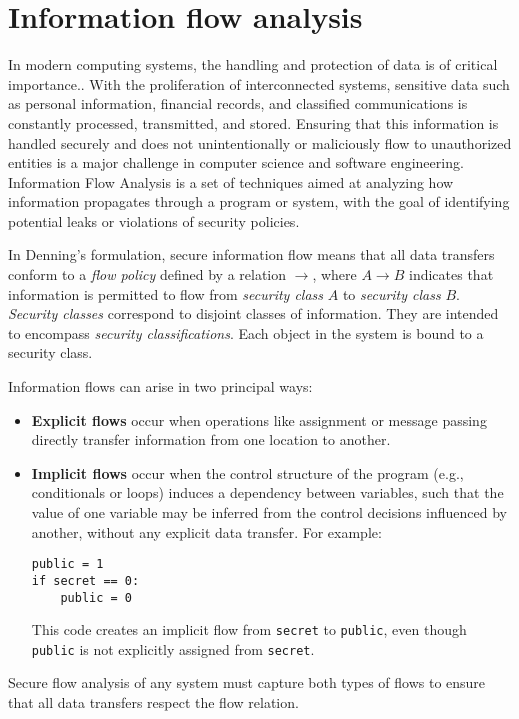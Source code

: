 \documentclass[12pt,a4paper,twoside]{book}
\begin{document}
\section{Information flow analysis}
In modern computing systems, the handling and protection of data is of critical importance.\cite{iso27001_2022}. With the proliferation of interconnected systems, sensitive data such as personal information, financial records, and classified communications is constantly processed, transmitted, and stored\cite{zhang2022data}. Ensuring that this information is handled securely and does not unintentionally or maliciously flow to unauthorized entities is a major challenge in computer science and software engineering\cite{zhang2022data}. Information Flow Analysis\cite{denning1976lattice} is a set of techniques aimed at analyzing how information propagates through a program or system, with the goal of identifying potential leaks or violations of security policies.

In Denning's formulation\cite{denning1976lattice}, secure information flow means that all data transfers conform to a \textit{flow policy} defined by a relation \( \rightarrow \), where \( A \rightarrow B \) indicates that information is permitted to flow from \textit{security class} \( A \) to \textit{security class} \( B \).
\textit{Security classes} correspond to disjoint classes of information. They are intended to encompass \textit{security classifications}. Each object in the system is bound to a security class.

Information flows can arise in two principal ways:
\begin{itemize}
  \item \textbf{Explicit flows} occur when operations like assignment or message passing directly transfer information from one location to another.
  \item \textbf{Implicit flows} occur when the control structure of the program (e.g., conditionals or loops) induces a dependency between variables, such that the value of one variable may be inferred from the control decisions influenced by another, without any explicit data transfer. For example:
\begin{lstlisting}[caption={Example of implicit flow}, label={lst:implicit_flow}]
public = 1
if secret == 0:
    public = 0
\end{lstlisting}
This code creates an implicit flow from \texttt{secret} to \texttt{public}, even though \texttt{public} is not explicitly assigned from \texttt{secret}.
\end{itemize}
Secure flow analysis of any system must capture both types of flows to ensure that all data transfers respect the flow relation.
\end{document}
